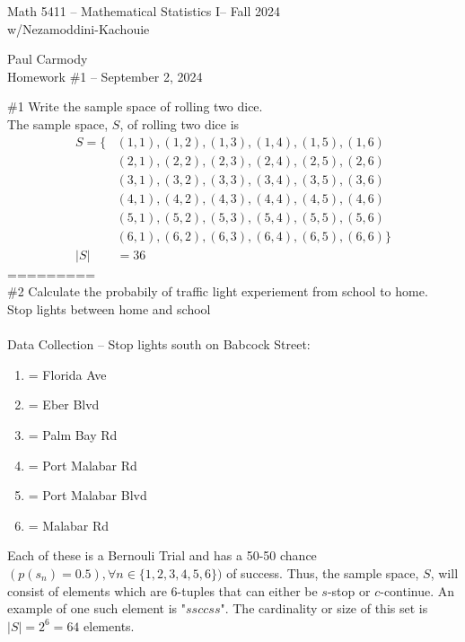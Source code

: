 \documentclass[10pt,a4paper]{report}
\newcommand{\CLASSNAME}{Math 5411 -- Mathematical Statistics I}
\newcommand{\PROFESSOR}{Nezamoddini-Kachouie}
\newcommand{\STUDENTNAME}{Paul Carmody}
\newcommand{\ASSIGNMENT}{Homework \#1 }
\newcommand{\DUEDATE}{September 2, 2024}
\newcommand{\SEMESTER}{Fall 2024}
\begin{document}
\begin{center}
	\Large{\CLASSNAME -- \SEMESTER} \\
	\large{w/\PROFESSOR}
\end{center}
\begin{center}
	\STUDENTNAME \\
	\ASSIGNMENT -- \DUEDATE\\
\end{center}

\#1 Write the sample space of rolling two dice.\\

The sample space, $S$, of rolling two dice is 
\begin{align*}
	S = \{ &(1,1), (1,2), (1,3), (1,4), (1,5), (1,6) \\
	&(2,1), (2,2), (2,3), (2,4), (2,5), (2,6) \\
	&(3,1), (3,2), (3,3), (3,4), (3,5), (3,6) \\
	&(4,1), (4,2), (4,3), (4,4), (4,5), (4,6) \\
	&(5,1), (5,2), (5,3), (5,4), (5,5), (5,6) \\
	&(6,1), (6,2), (6,3), (6,4), (6,5), (6,6)  \} \\
	|S| &= 36
\end{align*}
=========\\

\#2 Calculate the probabily of traffic light experiement from school to home.\\

Stop lights between home and school \\
\\
Data Collection -- Stop lights south on Babcock Street:
\begin{enumerate}[label=$s_\arabic*$]
\item = Florida Ave
\item = Eber Blvd
\item = Palm Bay Rd
\item = Port Malabar Rd
\item = Port Malabar Blvd
\item = Malabar Rd
\end{enumerate}
Each of these is a Bernouli Trial and has a 50-50 chance $(p(s_n)=0.5), \forall n \in \{1,2,3,4,5,6\} )$ of success.  Thus, the sample space, $S$, will consist of elements which are 6-tuples that can either be $s$-stop or $c$-continue.  An example of one such element is "$ssccss$".  The cardinality or size of this set is $|S| = 2^6 = 64$ elements.
\end{document}
